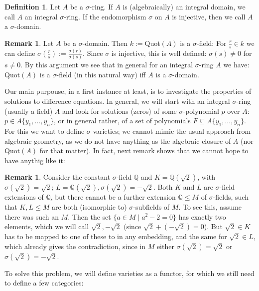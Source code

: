 \documentclass{article}
\def\Q{\mathbb{Q}}
\def\s{\sigma}
\theoremstyle{definition}
\newtheorem{rem}[Satz]{Remark}
\newtheorem{defn}[Satz]{Definition}
\begin{document}
\begin{defn}
Let $A$ be a $\s$-ring. If $A$ is (algebraically) an integral domain, we call $A$ an integral $\s$-ring. If the endomorphism $\s$ on $A$ is injective, then we call $A$ a $\s$-domain.
\end{defn}

\begin{rem}\label{sdomain=field}
Let $A$ be a $\s$-domain. Then $k:=$Quot$(A)$ is a $\s$-field: For $\frac{r}{s} \in k$ we can define $\s(\frac{r}{s}):= \frac{\s(r)}{\s(s)}$. Since $\s$ is injective, this is well defined: $\s(s) \neq 0$ for $s \neq 0$.
By this argument we see that in general for an integral $\s$-ring $A$ we have: Quot$(A)$ is a $\s$-field (in this natural way) iff $A$ is a $\s$-domain.
\end{rem}

Our main purpouse, in a first instance at least, is to investigate the properties of solutions to difference equations. 
In general, we will start with an integral $\s$-ring (usually a field) $A$ %
and look for solutions (zeros) of some $\s$-polynomial $p$ over $A$: $p \in A\{y_1, \ldots, y_n \}$, or in general rather, of a set of polynomials $F \subseteq A\{y_1, \ldots, y_n \}$. 
For this we want to define $\s$ varieties; we cannot mimic the usual approach from algebraic geometry, as we do not have anything as the algebraic closure of $A$ (nor Quot$(A)$ for that matter). 
In fact, next remark shows that we cannot hope to have anythig like it:

\begin{rem}\label{incompatibleextensions}
 Consider the constant $\s$-field $\Q$ and $K = \Q(\sqrt{2})$, with $\s (\sqrt{2}) = \sqrt{2}$; $L = \Q(\sqrt{2}), \s(\sqrt{2}) = - \sqrt{2}$. 
Both $K$ and $L$ are $\s$-field extensions of $\Q$, but there cannot be a further extension $\Q \leq M$ of $\s$-fields, such that $K,L \leq M$ are both (isomorphic to) $\s$-subfields of $M$. 
To see this, assume there was such an $M$. Then the set $\{ a \in M \mid a^2 - 2 = 0 \}$ has exactly two elements, which we will call $\sqrt{2}, -\sqrt{2}$ (since $\sqrt{2} + (- \sqrt{2}) = 0$).
But $\sqrt{2} \in K$ has to be mapped to one of these to in any embedding, and the same for $\sqrt{2} \in L$, which already gives the contradiction,
 since in $M$ either $\s(\sqrt{2}) = \sqrt{2}$ or $\s(\sqrt{2}) = -\sqrt{2}$.
\end{rem}

To solve this problem, we will define varieties as a functor, for which we still need to define a few categories:
\end{document}
